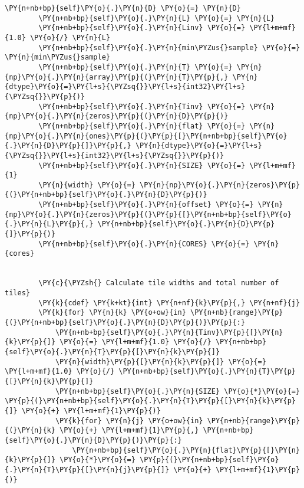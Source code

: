 \begin{Verbatim}[commandchars=\\\{\}]
        \PY{n+nb+bp}{self}\PY{o}{.}\PY{n}{D} \PY{o}{=} \PY{n}{D}
        \PY{n+nb+bp}{self}\PY{o}{.}\PY{n}{L} \PY{o}{=} \PY{n}{L}
        \PY{n+nb+bp}{self}\PY{o}{.}\PY{n}{Linv} \PY{o}{=} \PY{l+m+mf}{1.0} \PY{o}{/} \PY{n}{L}
        \PY{n+nb+bp}{self}\PY{o}{.}\PY{n}{min\PYZus{}sample} \PY{o}{=} \PY{n}{min\PYZus{}sample}
        \PY{n+nb+bp}{self}\PY{o}{.}\PY{n}{T} \PY{o}{=} \PY{n}{np}\PY{o}{.}\PY{n}{array}\PY{p}{(}\PY{n}{T}\PY{p}{,} \PY{n}{dtype}\PY{o}{=}\PY{l+s}{\PYZsq{}}\PY{l+s}{int32}\PY{l+s}{\PYZsq{}}\PY{p}{)}
        \PY{n+nb+bp}{self}\PY{o}{.}\PY{n}{Tinv} \PY{o}{=} \PY{n}{np}\PY{o}{.}\PY{n}{zeros}\PY{p}{(}\PY{n}{D}\PY{p}{)}
        \PY{n+nb+bp}{self}\PY{o}{.}\PY{n}{flat} \PY{o}{=} \PY{n}{np}\PY{o}{.}\PY{n}{ones}\PY{p}{(}\PY{p}{[}\PY{n+nb+bp}{self}\PY{o}{.}\PY{n}{D}\PY{p}{]}\PY{p}{,} \PY{n}{dtype}\PY{o}{=}\PY{l+s}{\PYZsq{}}\PY{l+s}{int32}\PY{l+s}{\PYZsq{}}\PY{p}{)}
        \PY{n+nb+bp}{self}\PY{o}{.}\PY{n}{SIZE} \PY{o}{=} \PY{l+m+mf}{1}
        \PY{n}{width} \PY{o}{=} \PY{n}{np}\PY{o}{.}\PY{n}{zeros}\PY{p}{(}\PY{n+nb+bp}{self}\PY{o}{.}\PY{n}{D}\PY{p}{)}
        \PY{n+nb+bp}{self}\PY{o}{.}\PY{n}{offset} \PY{o}{=} \PY{n}{np}\PY{o}{.}\PY{n}{zeros}\PY{p}{(}\PY{p}{[}\PY{n+nb+bp}{self}\PY{o}{.}\PY{n}{L}\PY{p}{,} \PY{n+nb+bp}{self}\PY{o}{.}\PY{n}{D}\PY{p}{]}\PY{p}{)}
        \PY{n+nb+bp}{self}\PY{o}{.}\PY{n}{CORES} \PY{o}{=} \PY{n}{cores}


        \PY{c}{\PYZsh{} Calculate tile widths and total number of tiles}
        \PY{k}{cdef} \PY{k+kt}{int} \PY{n+nf}{k}\PY{p}{,} \PY{n+nf}{j}
        \PY{k}{for} \PY{n}{k} \PY{o+ow}{in} \PY{n+nb}{range}\PY{p}{(}\PY{n+nb+bp}{self}\PY{o}{.}\PY{n}{D}\PY{p}{)}\PY{p}{:}
            \PY{n+nb+bp}{self}\PY{o}{.}\PY{n}{Tinv}\PY{p}{[}\PY{n}{k}\PY{p}{]} \PY{o}{=} \PY{l+m+mf}{1.0} \PY{o}{/} \PY{n+nb+bp}{self}\PY{o}{.}\PY{n}{T}\PY{p}{[}\PY{n}{k}\PY{p}{]}
            \PY{n}{width}\PY{p}{[}\PY{n}{k}\PY{p}{]} \PY{o}{=} \PY{l+m+mf}{1.0} \PY{o}{/} \PY{n+nb+bp}{self}\PY{o}{.}\PY{n}{T}\PY{p}{[}\PY{n}{k}\PY{p}{]}
            \PY{n+nb+bp}{self}\PY{o}{.}\PY{n}{SIZE} \PY{o}{*}\PY{o}{=} \PY{p}{(}\PY{n+nb+bp}{self}\PY{o}{.}\PY{n}{T}\PY{p}{[}\PY{n}{k}\PY{p}{]} \PY{o}{+} \PY{l+m+mf}{1}\PY{p}{)}
            \PY{k}{for} \PY{n}{j} \PY{o+ow}{in} \PY{n+nb}{range}\PY{p}{(}\PY{n}{k} \PY{o}{+} \PY{l+m+mf}{1}\PY{p}{,} \PY{n+nb+bp}{self}\PY{o}{.}\PY{n}{D}\PY{p}{)}\PY{p}{:}
                \PY{n+nb+bp}{self}\PY{o}{.}\PY{n}{flat}\PY{p}{[}\PY{n}{k}\PY{p}{]} \PY{o}{*}\PY{o}{=} \PY{p}{(}\PY{n+nb+bp}{self}\PY{o}{.}\PY{n}{T}\PY{p}{[}\PY{n}{j}\PY{p}{]} \PY{o}{+} \PY{l+m+mf}{1}\PY{p}{)}


\end{Verbatim}
